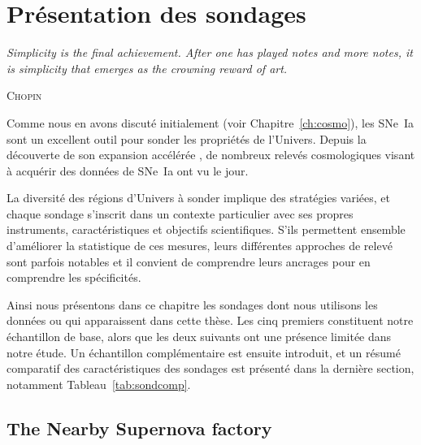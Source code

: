 \documentclass[../main/main.tex]{subfiles}
\begin{document}

\chapter{Pr\'esentation des sondages}\label{ch:surveys}
\epigraph{\openquote\textit{Simplicity is the final achievement. After one has
        played notes and more notes, it is simplicity that emerges as the
crowning reward of art.}\closequote}{\textsc{Chopin}}

\vfill
Comme nous en avons discuté initialement (voir Chapitre~\ref{ch:cosmo}), les
SNe~Ia sont un excellent outil pour sonder les propriétés de l'Univers. Depuis
la découverte de son expansion accélérée \citep{riess1998, perlmutter1999}, de
nombreux relevés cosmologiques visant à acquérir des données de SNe~Ia ont vu le
jour.

La diversité des régions d'Univers à sonder implique des stratégies variées, et
chaque sondage s'inscrit dans un contexte particulier avec ses propres
instruments, caractéristiques et objectifs scientifiques. S'ils permettent
ensemble d'améliorer la statistique de ces mesures, leurs différentes approches
de relevé sont parfois notables et il convient de comprendre leurs ancrages pour
en comprendre les spécificités.

Ainsi nous présentons dans ce chapitre les sondages dont nous utilisons les
données ou qui apparaissent dans cette thèse. Les cinq premiers constituent
notre échantillon de base, alors que les deux suivants ont une présence limitée
dans notre étude. Un échantillon complémentaire est ensuite introduit, et un
résumé comparatif des caractéristiques des sondages est présenté dans la
dernière section, notamment Tableau~\ref{tab:sondcomp}.

\vfill

\newpage
\thispagestyle{plain}
\vfill
\minitoc
\vfill

\newpage

\thispagestyle{plain}
\vspace*{\fill}
\minilof
\vspace*{\fill}
\minilot
\vspace*{\fill}

\newpage

\section{The Nearby Supernova factory}\label{sec:snf}
\end{document}
